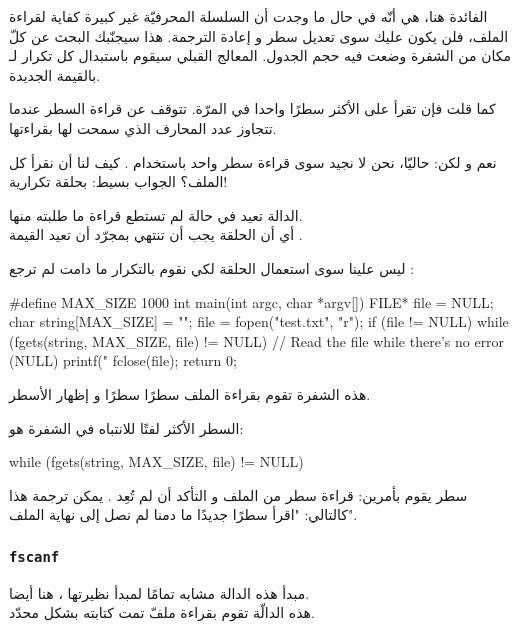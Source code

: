 الفائدة هنا، هي أنّه في حال ما وجدت أن السلسلة المحرفيّة غير كبيرة كفاية لقراءة الملف، فلن يكون عليك سوى تعديل سطر 
و إعادة الترجمة. هذا سيجنّبك البحث عن كلّ مكان من الشفرة وضعت فيه حجم الجدول. المعالج القبلي سيقوم باستبدال كل تكرار لـ
بالقيمة الجديدة.

كما قلت فإن
تقرأ على الأكثر سطرًا واحدا في المرّة. تتوقف عن قراءة السطر عندما تتجاوز عدد المحارف الذي سمحت لها بقراءتها.

نعم و لكن: حاليّا، نحن لا نجيد سوى قراءة سطر واحد باستخدام
.
كيف لنا أن نقرأ كل الملف؟ الجواب بسيط: بحلقة تكرارية!

الدالة
تعيد
في حالة لم تستطع قراءة ما طلبته منها.\\
أي أن الحلقة يجب أن تنتهي بمجرّد أن تعيد
القيمة
.

ليس علينا سوى استعمال الحلقة
لكي نقوم بالتكرار ما دامت
لم ترجع
:

\begin{Csource}
#define MAX_SIZE 1000
int main(int argc, char *argv[])
{
    FILE* file = NULL;
    char string[MAX_SIZE] = "";
    file = fopen("test.txt", "r");
    if (file != NULL)
    {
        while (fgets(string, MAX_SIZE, file) != NULL) // Read the file while there's no error (NULL)
        {
            printf("%
        }
        fclose(file);
    }
    return 0;
}
\end{Csource}

هذه الشفرة تقوم بقراءة الملف سطرًا سطرًا و إظهار الأسطر.

السطر الأكثر لفتًا للانتباه في الشفرة هو:

\begin{Csource}
while (fgets(string, MAX_SIZE, file) != NULL)
\end{Csource}

سطر 
يقوم بأمرين: قراءة سطر من الملف و التأكد أن
لم تُعِد
.
يمكن ترجمة هذا كالتالي: "اقرأ سطرًا جديدًا ما دمنا لم نصل إلى نهاية الملف".

\subsubsection{\texttt{fscanf}}

مبدأ هذه الدالة مشابه تمامًا لمبدأ نظيرتها
،
هنا أيضا.\\
هذه الدالّة تقوم بقراءة ملفّ تمت كتابته بشكل محدّد.

